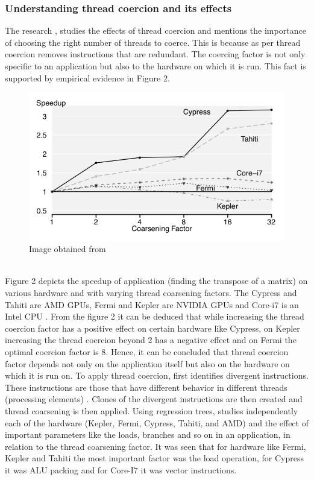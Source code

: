 \documentclass[a4paper,11pt]{article}
\begin{document}
  \subsubsection{Understanding thread coercion and its effects}
  The research \cite{threadseminal}, studies the effects of thread coercion and mentions the importance of choosing the right number of threads to coerce. This is because as per \cite{threadseminal} thread coercion removes instructions that are redundant. The coercing factor is not only specific to an application but also to the hardware on which it is run. This fact is supported by empirical evidence in Figure 2.
   \begin{figure}[h!]
  	\caption{Image obtained from \cite{threadseminal}}
  	\begin{center}
  	\includegraphics[scale=0.6]{Thread_Coercion.png}
  	  	\end{center}
  \end{figure}\\
  \indent Figure 2 depicts the speedup of application (finding the transpose of a matrix) on various hardware and with varying thread coarsening factors. The Cypress and Tahiti are AMD GPUs, Fermi and Kepler are NVIDIA GPUs and Core-i7 is an Intel CPU \cite{threadseminal}. From the figure 2 it can be deduced that while increasing the thread coercion factor has a positive effect on certain hardware like Cypress, on Kepler increasing the thread coercion beyond 2 has a negative effect and on Fermi the optimal coercion factor is 8. Hence, it can be concluded that thread coercion factor depends not only on the application itself but also on the hardware on which it is run on. To apply thread coercion, \cite{threadseminal} first identifies divergent instructions. These instructions are those that have different behavior in different threads (processing elements) \cite{divergence}. Clones of the divergent instructions are then created and thread coarsening is then applied. Using regression trees, \cite{threadseminal} studies independently each of the hardware (Kepler, Fermi, Cypress, Tahiti, and AMD) and the effect of important parameters like the loads, branches and so on in an application, in relation to the thread coarsening factor. It was seen that for hardware like Fermi, Kepler and Tahiti the most important factor was the load operation, for Cypress it was ALU packing and for Core-I7 it was vector instructions.\\
\end{document}
